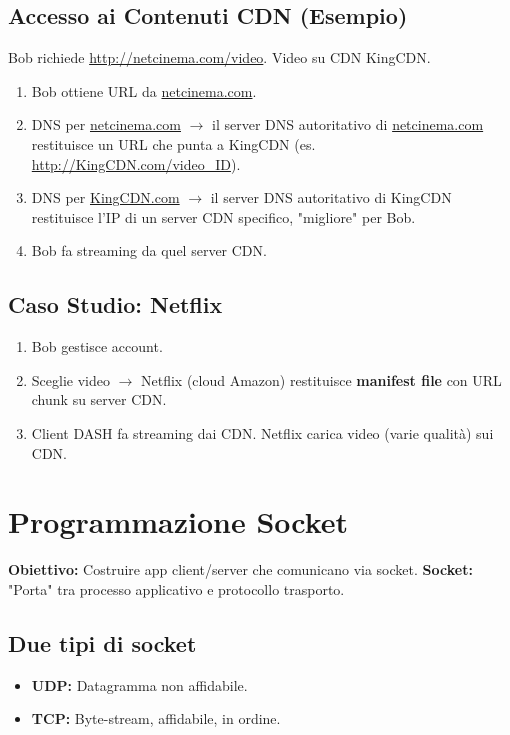 \documentclass{article}
\begin{document}
\subsection{Accesso ai Contenuti CDN (Esempio)}
Bob richiede \url{http://netcinema.com/video}. Video su CDN KingCDN.
\begin{enumerate}
    \item Bob ottiene URL da \url{netcinema.com}.
    \item DNS per \url{netcinema.com} $\rightarrow$ il server DNS autoritativo di \url{netcinema.com} restituisce un URL che punta a KingCDN (es. \url{http://KingCDN.com/video_ID}).
    \item DNS per \url{KingCDN.com} $\rightarrow$ il server DNS autoritativo di KingCDN restituisce l'IP di un server CDN specifico, "migliore" per Bob.
    \item Bob fa streaming da quel server CDN.
\end{enumerate}

\subsection{Caso Studio: Netflix}
\begin{enumerate}
    \item Bob gestisce account.
    \item Sceglie video $\rightarrow$ Netflix (cloud Amazon) restituisce \textbf{manifest file} con URL chunk su server CDN.
    \item Client DASH fa streaming dai CDN. Netflix carica video (varie qualità) sui CDN.
\end{enumerate}

\section{Programmazione Socket}
\textbf{Obiettivo:} Costruire app client/server che comunicano via socket.
\textbf{Socket:} "Porta" tra processo applicativo e protocollo trasporto.

\subsection{Due tipi di socket}
\begin{itemize}
    \item \textbf{UDP:} Datagramma non affidabile.
    \item \textbf{TCP:} Byte-stream, affidabile, in ordine.
\end{itemize}
\end{document}
